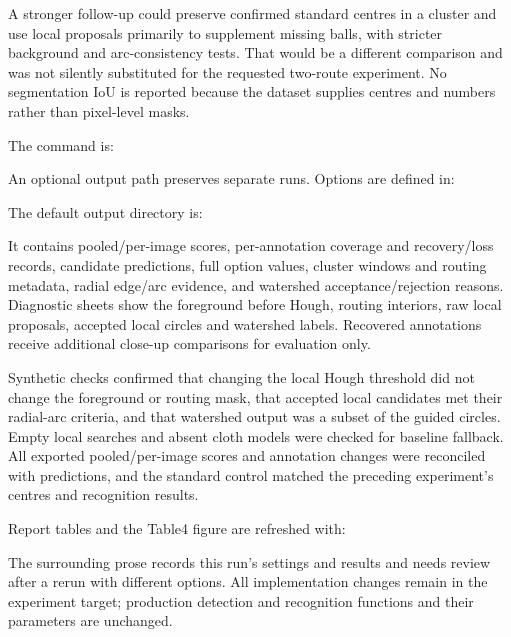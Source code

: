 A stronger follow-up could preserve confirmed standard centres in a
cluster and use local proposals primarily to supplement missing balls,
with stricter background and arc-consistency tests. That would be a
different comparison and was not silently substituted for the requested
two-route experiment. No segmentation IoU is reported because the
dataset supplies centres and numbers rather than pixel-level masks.

The command is:
\begin{quote}
\end{quote}
An optional output path preserves separate runs. Options are defined in:
\begin{quote}
\end{quote}
The default output directory is:
\begin{quote}
\end{quote}
It contains pooled/per-image scores, per-annotation coverage and
recovery/loss records, candidate predictions, full option values,
cluster windows and routing metadata, radial edge/arc evidence, and
watershed acceptance/rejection reasons. Diagnostic sheets show the
foreground before Hough, routing interiors, raw local proposals,
accepted local circles and watershed labels. Recovered annotations
receive additional close-up comparisons for evaluation only.

Synthetic checks confirmed that changing the local Hough threshold did
not change the foreground or routing mask, that accepted local candidates
met their radial-arc criteria, and that watershed output was a subset
of the guided circles. Empty local searches and absent cloth models
were checked for baseline fallback. All exported pooled/per-image scores
and annotation changes were reconciled with predictions, and the standard
control matched the preceding experiment's centres and recognition results.

Report tables and the Table4 figure are refreshed with:
\begin{quote}
\end{quote}
The surrounding prose records this run's settings and results and
needs review after a rerun with different options. All implementation
changes remain in the experiment target; production detection and
recognition functions and their parameters are unchanged.
